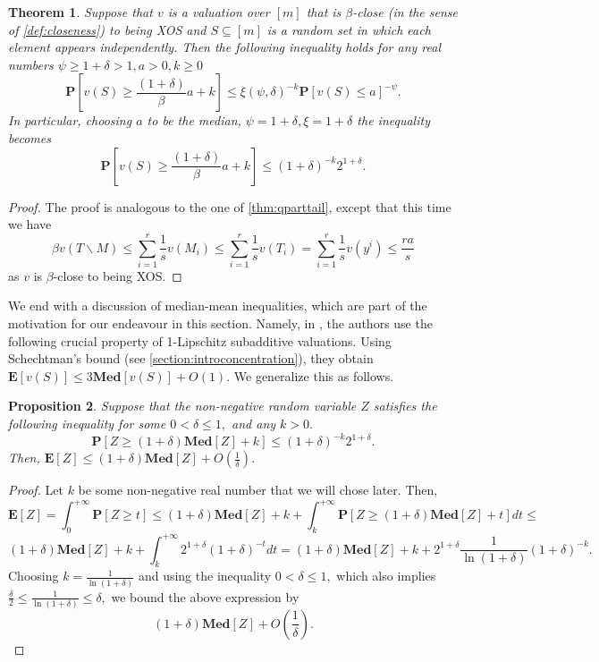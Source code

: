 \documentclass[11pt]{article}%
\newtheorem{theorem}{Theorem}
\newtheorem{proposition}[theorem]{Proposition}
\numberwithin{theorem}{subsection}
\newcommand{\prob}{\mathbf{P}}
\newcommand{\median}{\mathbf{Med}}
\newcommand{\expect}{\mathbf{E}}
\begin{document}
\begin{theorem}
\label{thm:tailboundxos}
    Suppose that $v$ is a valuation over $[m]$ that is $\beta$-close (in the sense of \cref{def:closeness}) to being XOS and $S\subseteq [m]$ is a random set in which each element appears independently. Then the following inequality holds for any real numbers $\psi\ge 1+\delta>1,a>0, k\ge 0$
    $$
    \prob[v(S)\ge \frac{(1+\delta)}{\beta}a+k]\le 
    \xi(\psi, \delta)^{-k}\prob[v(S)\le a]^{-\psi}.
    $$
    In particular, choosing $a$ to be the median, $\psi = 1+\delta,\xi = 1+\delta$ the inequality becomes
    $$
    \prob[v(S)\ge \frac{(1+\delta)}{\beta}a+k]\le 
    \left(1+\delta\right)^{-k}2^{1+\delta}.
    $$
\end{theorem}
\begin{proof}
The proof is analogous to the one of \cref{thm:qparttail}, except that this time we have 
$$
\beta v(T\backslash M)\le \sum_{i=1}^r \frac{1}{s}v(M_i)\le 
\sum_{i=1}^r \frac{1}{s}v(T_i) = 
\sum_{i=1}^r \frac{1}{s}v(y^i)
\le 
\frac{ra}{s}
$$
as $v$ is $\beta$-close to being XOS.
\end{proof}


\noindent
We end with a discussion of median-mean inequalities, which are part of the motivation for our endeavour in this section. Namely, in \cite{RubinsteinW18}, the authors use the following crucial property of 1-Lipschitz subadditive valuations. Using Schechtman's bound (see \cref{section:introconcentration}), they obtain
$\expect[v(S)]\le 
3\median[v(S)] + O(1)
.$ We generalize this as follows.

\begin{proposition}
\label{prop:mediantomean}
Suppose that the non-negative random variable $Z$ satisfies the following inequality for some $0<\delta\le 1,$ and any $k >0.$
$$
\prob[Z\ge (1 + \delta)\median[Z] + k]\le 
(1+\delta)^{-k}2^{1+\delta}.
$$
Then, $\expect[Z]\le (1 + \delta)\median[Z] + O(\frac{1}{\delta}).$
\end{proposition}
\begin{proof}
Let $k$ be some non-negative real number that we will chose later. Then, 
$$
\expect[Z] = 
\int_0^{+\infty}
\prob[Z\ge t]\le 
(1 + \delta)\median[Z] + k
+
\int_{k}^{+\infty}
\prob[Z\ge (1 + \delta)\median[Z] + t]d t\le 
$$
$$
(1 + \delta)\median[Z] + k
+
\int_{k}^{+\infty}
2^{1+\delta}(1+\delta)^{-t}dt = 
(1 + \delta)\median[Z] + k
+
2^{1+\delta}\frac{1}{\ln (1 + \delta)}(1+\delta)^{-k}.
$$
Choosing $k = \frac{1}{\ln(1+\delta)}$ and using the inequality 
$0 <\delta \le 1,$ which also implies 
$\frac{\delta}{2}\le \frac{1}{\ln (1+\delta)}\le \delta,$ we bound the above expression by 
$$
(1 + \delta)\median[Z] + O\left(\frac{1}{\delta}\right).
$$
\end{proof}
\end{document}
